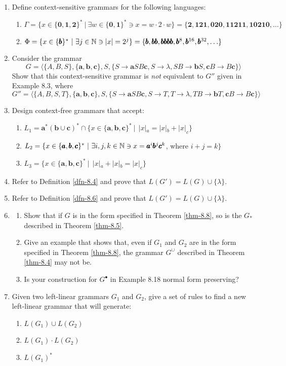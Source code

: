 \begin{enumerate}[{8.}1. ]
\item Define context-sensitive grammars for the following languages:
\begin{enumerate}
\item $\Gamma = \{x\in\{\pmb{0},\pmb{1},\pmb{2}\}^*\ |\ \exists w\in\{\pmb{0},
\pmb{1}\}^*\ni x=w\cdot 2\cdot w\}=\{\pmb{2},\pmb{121},\pmb{020},\pmb{11211},
\pmb{10210},\ldots\}$
\item $\Phi = \{x\in\{\pmb{b}\}^*\ |\ \exists j\in\mathbb{N}\ni |x|=2^j\}=\{\pmb{b},
\pmb{bb},\pmb{bbbb},\pmb{b}^8,\pmb{b}^{16},\pmb{b}^{32},\ldots\}$
\end{enumerate}

\item Consider the grammar
\[ G=\langle\{A,B,S\},\{\pmb{a},\pmb{b},\pmb{c}\},S,\{S\rightarrow\pmb{a}SB
	\pmb{c},S\rightarrow\lambda,SB\rightarrow\pmb{b}S,\pmb{c}B\rightarrow B
	\pmb{c}\}\rangle \]
Show that this context-sensitive grammar is \emph{not} equivalent to $G''$ given in
Example 8.3, where
\[ G'' = \langle\{A,B,S,T\},\{\pmb{a},\pmb{b},\pmb{c}\},S,\{S\rightarrow\pmb{a}SB
	\pmb{c},S\rightarrow T,T\rightarrow\lambda,TB\rightarrow\pmb{b}T,\pmb{c}
	B\rightarrow B\pmb{c}\}\rangle \]

\item Design context-free grammars that accept:
\begin{enumerate}
\item $L_1=\pmb{a}^*(\pmb{b}\cup\pmb{c})^*\cap\{x\in\{\pmb{a},\pmb{b},\pmb{c}\}^*
\ |\ \ |x|_a = |x|_b + |x|_c\}$
\item $L_2 = \{x\in\{\pmb{a},\pmb{b},\pmb{c}\}^*\ |\ \exists i,j,k\in\mathbb{N} \ni x =
\pmb{a}^i\pmb{b}^j\pmb{c}^k$, where $i + j = k\}$
\item $L_3 = \{x\in\{\pmb{a},\pmb{b},\pmb{c}\}^*\ |\ \ |x|_a + |x|_b = |x|_c\}$
\end{enumerate}

\item Refer to Definition \ref{dfn-8.4} and prove that $L(G') = L(G) \cup \{\lambda\}$.

\item Refer to Definition \ref{dfn-8.6} and prove that $L(G') = L(G) \cup \{\lambda\}$.

\item \begin{enumerate}
\item Show that if $G$ is in the form specified in Theorem \ref{thm-8.8}, so is the $G_*$ described in
Theorem \ref{thm-8.5}.
\item Give an example that shows that, even if $G_1$ and $G_2$ are in the form
specified in Theorem \ref{thm-8.8}, the grammar $G^{\cup}$ described in Theorem \ref{thm-8.4} may
not be.
\item Is your construction for $G^\bullet$ in Example 8.18 normal form preserving?
\end{enumerate}

\item Given two left-linear grammars $G_1$ and $G_2$, give a set of rules to
find a new left-linear grammar that will generate:
\begin{enumerate}
\item $L(G_1) \cup L(G_2)$
\item $L(G_1)\cdot L(G_2)$
\item $L(G_1)^*$
\end{enumerate}
\end{enumerate}
